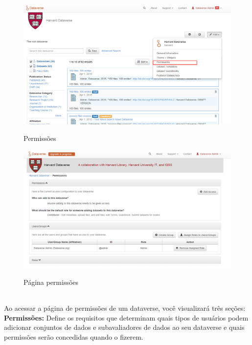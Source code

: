 \documentclass[12pt,hidelinks]{article}
\begin{document}
\newpage

\begin{figure}[H]
\caption{Permissões}
\centering
    \includegraphics[width=1.0\textwidth]{imagens/prt1.png}
    \label{Permissões}
\end{figure}

\begin{figure}[H]
\caption{Página permissões}
\centering
    \includegraphics[width=1.0\textwidth]{Prints/NOVOTIR.png}
    \label{Permissões 2}
\end{figure}
\\

Ao acessar a página de permissões de um dataverse, você visualizará três seções:\\

\textbf{Permissões:} Define os requisitos que determinam quais tipos de usuários podem adicionar conjuntos de dados e subavaliadores de dados ao seu dataverse e quais permissões serão concedidas quando o fizerem.\\
\end{document}
